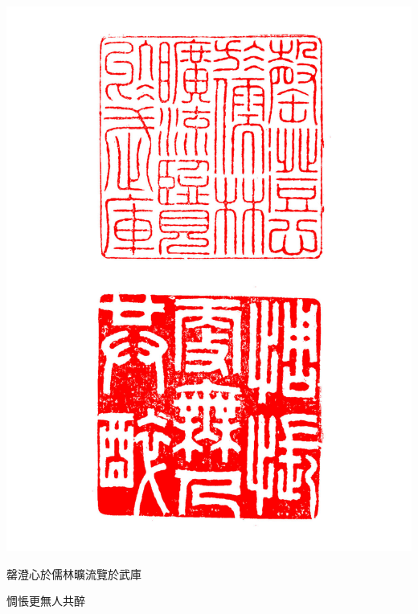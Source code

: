 \documentclass{zhvt-classic}
\begin{document}
\hfil \includegraphics[angle=90]{stamp02}
\clearpage

罄澄心於儒林曠流覽於武庫

惆悵更無人共醉
\end{document}
